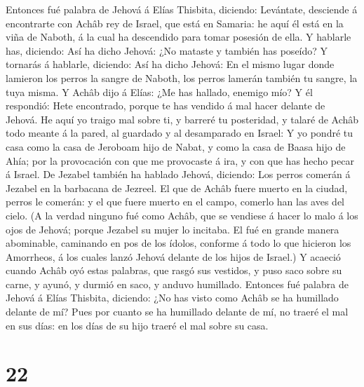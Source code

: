 Entonces fué palabra de Jehová á Elías Thisbita, diciendo: 
Levántate, desciende á encontrarte con Achâb rey de Israel, que está en
Samaria: he aquí él está en la viña de Naboth, á la cual ha descendido
para tomar posesión de ella.  Y hablarle has, diciendo: Así
ha dicho Jehová: ¿No mataste y también has poseído? Y tornarás á
hablarle, diciendo: Así ha dicho Jehová: En el mismo lugar donde
lamieron los perros la sangre de Naboth, los perros lamerán también tu
sangre, la tuya misma.  Y Achâb dijo á Elías: ¿Me has
hallado, enemigo mío? Y él respondió: Hete encontrado, porque te has
vendido á mal hacer delante de Jehová.  He aquí yo traigo
mal sobre ti, y barreré tu posteridad, y talaré de Achâb todo meante á
la pared, al guardado y al desamparado en Israel:  Y yo
pondré tu casa como la casa de Jeroboam hijo de Nabat, y como la casa de
Baasa hijo de Ahía; por la provocación con que me provocaste á ira, y
con que has hecho pecar á Israel.  De Jezabel también ha
hablado Jehová, diciendo: Los perros comerán á Jezabel en la barbacana
de Jezreel.  El que de Achâb fuere muerto en la ciudad,
perros le comerán: y el que fuere muerto en el campo, comerlo han las
aves del cielo.  (A la verdad ninguno fué como Achâb, que
se vendiese á hacer lo malo á los ojos de Jehová; porque Jezabel su
mujer lo incitaba.  El fué en grande manera abominable,
caminando en pos de los ídolos, conforme á todo lo que hicieron los
Amorrheos, á los cuales lanzó Jehová delante de los hijos de Israel.)
 Y acaeció cuando Achâb oyó estas palabras, que rasgó sus
vestidos, y puso saco sobre su carne, y ayunó, y durmió en saco, y
anduvo humillado.  Entonces fué palabra de Jehová á Elías
Thisbita, diciendo:  ¿No has visto como Achâb se ha
humillado delante de mí? Pues por cuanto se ha humillado delante de mí,
no traeré el mal en sus días: en los días de su hijo traeré el mal sobre
su casa.

\hypertarget{section-21}{%
\section{22}\label{section-21}}

